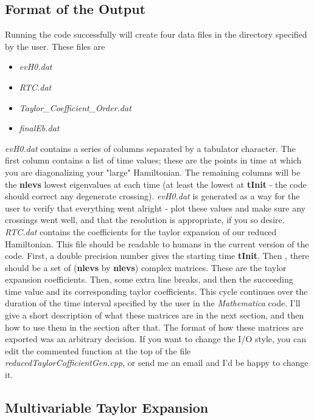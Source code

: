\documentclass[12pt]{article}
\begin{document}
\subsection{Format of the Output}
Running the code successfully will create four data files in the directory specified by the user. These files are
\begin{itemize}
\item \textit{evH0.dat}
\item \textit{RTC.dat}
\item \textit{Taylor\_Coefficient\_Order.dat}
\item \textit{finalEb.dat}
\end{itemize}
 \textit{evH0.dat} contains a series of columns separated by a tabulator character. The first column contains a list of time values; these are the points in time at which you are diagonalizing your "large" Hamiltonian. The remaining columns will be the  \textbf{nlevs} lowest eigenvalues at each time (at least the lowest at \textbf{tInit} - the code should correct any degenerate crossing). \textit{evH0.dat} is generated as a way for the user to verify that everything went alright - plot these values and make sure any crossings went well, and that the resolution is appropriate, if you so desire.
 \newline
 \newline
 \textit{RTC.dat} contains the coefficients for the taylor expansion of our reduced Hamiltonian. This file should be readable to humans in the current version of the code. First, a double precision number gives the starting time \textbf{tInit}. Then , there should be a set of (\textbf{nlevs} by \textbf{nlevs}) complex matrices. These are the taylor expansion coefficients. Then, some extra line breaks, and then the succeeding time value and its corresponding taylor coefficients. This cycle continues over the duration of the time interval specified by the user in the \textit{Mathematica} code. I'll give a short description of what these matrices are in the next section, and then how to use them in the section after that. The format of how these matrices are exported was an arbitrary decision. If you want to change the I/O style, you can edit the commented function at the top of the file \textit{reducedTaylorCofficientGen.cpp}, or send me an email and I'd be happy to change it.
\subsection{Multivariable Taylor Expansion}
\end{document}
